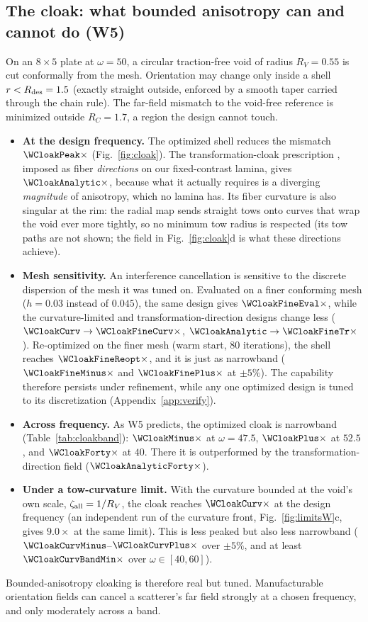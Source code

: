 \subsection{The cloak: what bounded anisotropy can and cannot do (W5)}\label{sec:cloak}
On an $8\times5$ plate at $\omega=50$, a circular traction-free void of radius
$R_V=0.55$ is cut conformally from the mesh. Orientation may change only inside a shell
$r<R_{\rm des}=1.5$ (exactly straight outside, enforced by a smooth taper carried through
the chain rule). The far-field mismatch to the void-free reference is minimized outside
$R_C=1.7$, a region the design cannot touch.
\begin{itemize}[itemsep=1pt]
\item \textbf{At the design frequency.} The optimized shell reduces the mismatch
  $\WCloakPeak\times$ (Fig.~\ref{fig:cloak}). The transformation-cloak prescription
  \cite{pendry2006,norris2008}, imposed as fiber \emph{directions} on our fixed-contrast
  lamina, gives $\WCloakAnalytic\times$, because what it actually requires is a
  diverging \emph{magnitude} of anisotropy, which no lamina has. Its fiber curvature is
  also singular at the rim: the radial map sends straight tows onto curves that wrap the
  void ever more tightly, so no minimum tow radius is respected (its tow paths are not shown; the field in Fig.~\ref{fig:cloak}d is what these directions achieve).
\item \textbf{Mesh sensitivity.} An interference cancellation is sensitive to the
  discrete dispersion of the mesh it was tuned on. Evaluated on a finer conforming mesh
  ($h=0.03$ instead of $0.045$), the same design gives $\WCloakFineEval\times$, while the
  curvature-limited and transformation-direction designs change less
  ($\WCloakCurv\to\WCloakFineCurv\times$, $\WCloakAnalytic\to\WCloakFineTr\times$). Re-optimized on the finer mesh (warm
  start, 80 iterations), the shell reaches $\WCloakFineReopt\times$, and it is just as narrowband
  ($\WCloakFineMinus\times$ and $\WCloakFinePlus\times$ at $\pm5\%$). The capability
  therefore persists under refinement, while any one optimized design is tuned to its
  discretization
  (Appendix~\ref{app:verify}).
\item \textbf{Across frequency.} As W5 predicts, the optimized cloak is narrowband
  (Table~\ref{tab:cloakband}): $\WCloakMinus\times$ at $\omega=47.5$, $\WCloakPlus\times$
  at $52.5$, and $\WCloakForty\times$ at $40$. There it is outperformed by the
  transformation-direction field ($\WCloakAnalyticForty\times$).
\item \textbf{Under a tow-curvature limit.} With the curvature bounded at the void's own
  scale, $\zeta_{\rm all}=1/R_V$, the cloak reaches $\WCloakCurv\times$ at the design
  frequency (an independent run of the curvature front, Fig.~\ref{fig:limitsW}c, gives
  $9.0\times$ at the same limit). This is less peaked but also less narrowband
  ($\WCloakCurvMinus$--$\WCloakCurvPlus\times$ over $\pm5\%$, and at least
  $\WCloakCurvBandMin\times$ over $\omega\in[40,60]$).
\end{itemize}
Bounded-anisotropy cloaking is therefore real but tuned. Manufacturable orientation
fields can cancel a scatterer's far field strongly at a chosen frequency, and only
moderately across a band.

